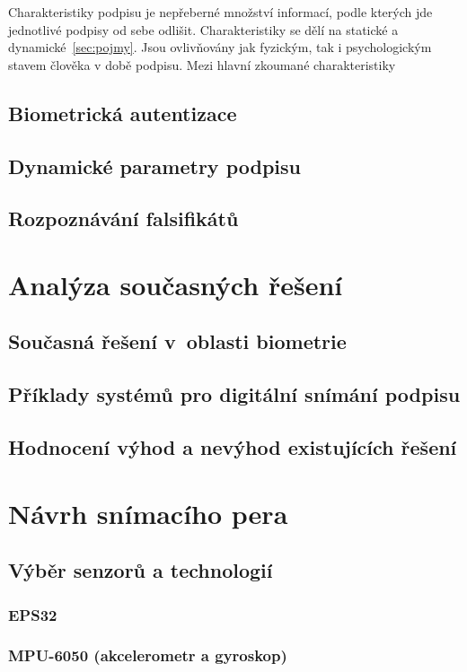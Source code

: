Charakteristiky podpisu je nepřeberné množství informací, podle kterých jde jednotlivé podpisy od sebe odlišit. 
Charakteristiky se dělí na statické a dynamické~\ref{sec:pojmy}. 
Jsou ovlivňovány jak fyzickým, tak i psychologickým stavem člověka v době podpisu.
Mezi hlavní zkoumané charakteristiky


\section{Biometrická autentizace}


\section{Dynamické parametry podpisu}


\section{Rozpoznávání falsifikátů}

\chapter{Analýza současných řešení}
\section{Současná řešení v~oblasti biometrie}
\section{Příklady systémů pro digitální snímání podpisu}
\section{Hodnocení výhod a nevýhod existujících řešení}

\chapter{Návrh snímacího pera}
\section{Výběr senzorů a technologií}
\subsection{EPS32}
\subsection{MPU-6050 (akcelerometr a gyroskop)}
